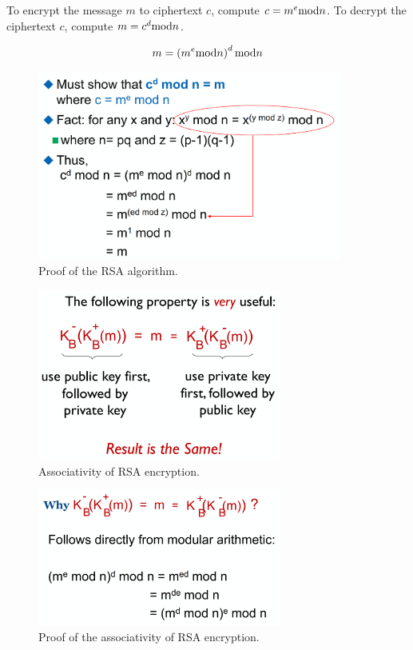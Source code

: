 To encrypt the message \(m\) to ciphertext \(c\), compute \(c = m^e \textup{mod} n\).
To decrypt the ciphertext \(c\), compute \(m = c^d \textup{mod} n\).

\begin{equation*}
  m = \left(m^e \textup{mod} n\right)^d \textup{mod} n
\end{equation*}

\begin{figure}[htp]
  \centering
  \includegraphics[width=10cm]{unit-20/figures/rsa-proof.png}
  \caption*{Proof of the RSA algorithm.}
\end{figure}

\begin{figure}[htp]
  \centering
  \includegraphics[width=8cm]{unit-20/figures/rsa-associativity.png}
  \caption*{Associativity of RSA encryption.}
\end{figure}

\begin{figure}[htp]
  \centering
  \includegraphics[width=8cm]{unit-20/figures/rsa-associativity-proof.png}
  \caption*{Proof of the associativity of RSA encryption.}
\end{figure}

